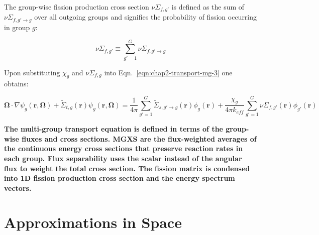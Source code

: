 The group-wise fission production cross section $\nu\Sigma_{f,g'}$ is defined as the sum of $\nu\Sigma_{f,g'\rightarrow g}$ over all outgoing groups and signifies the probability of fission occurring in group $g$:

\begin{dmath}
\label{eqn:chap2-nusifg}
\nu\Sigma_{f,g'} \equiv \displaystyle\sum\limits_{g'=1}^{G}\nu\Sigma_{f,g'\rightarrow g}
\end{dmath}

\noindent Upon substituting $\chi_{g}$ and $\nu\Sigma_{f,g}$ into Eqn.~\ref{eqn:chap2-transport-mg-3} one obtains:

\begin{dmath}
\label{eqn:chap2-transport-mg-4}
\mathbf{\Omega} \cdot \nabla \psi_{g}(\mathbf{r},\mathbf{\Omega}) + \tilde{\Sigma}_{t,g}(\mathbf{r})\psi_{g}(\mathbf{r},\mathbf{\Omega}) = \frac{1}{4\pi} \sum_{g'=1}^{G} \tilde{\Sigma}_{s,g' \rightarrow g}(\mathbf{r}) \phi_{g}(\mathbf{r}) + \frac{\chi_{g}}{4\pi k_{eff}}\sum_{g'=1}^{G} \nu\Sigma_{f,g'}(\mathbf{r})\phi_{g'}(\mathbf{r})
\end{dmath}



\begin{emphbox}
\textbf{The multi-group transport equation is defined in terms of the group-wise fluxes and cross sections. \ac{MGXS} are the flux-weighted averages of the continuous energy cross sections that preserve reaction rates in each group. Flux separability uses the scalar instead of the angular flux to weight the total cross section. The fission matrix is condensed into 1D fission production cross section and the energy spectrum vectors.}
\end{emphbox}


\section{Approximations in Space}
\label{sec:chap2-approx-space}

